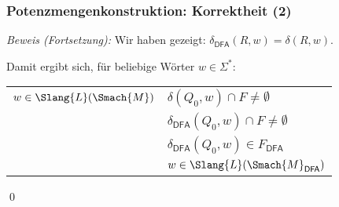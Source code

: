 \documentclass[aspectratio=1610,onlymath]{beamer}
\begin{document}
\begin{frame}[t]\frametitle{Potenzmengenkonstruktion: Korrektheit (2)}


\emph{Beweis (Fortsetzung):} Wir haben gezeigt: $\delta_{\textsf{DFA}}(R,w) = \delta(R,w)$.\pause
\medskip

Damit ergibt sich, für beliebige Wörter $w\in\Sigma^*$:\medskip

\begin{tabular}{l@{~~~ gdw. ~~~}l}
$w\in \Slang{L}(\Smach{M})$ & \pause$\delta(Q_0,w)\cap F \neq \emptyset$ \\\pause
	& $\delta_{\textsf{DFA}}(Q_0,w)\cap F \neq \emptyset$ \\\pause
	& $\delta_{\textsf{DFA}}(Q_0,w)\in F_{\textsf{DFA}}$ \\\pause
	& $w\in \Slang{L}(\Smach{M}_{\textsf{DFA}})$
\end{tabular}

\qed

\end{frame}
\end{document}
